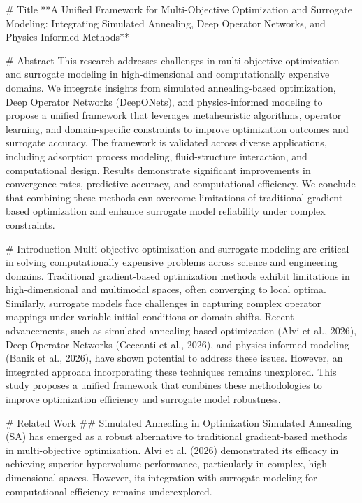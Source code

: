 # Title  
**A Unified Framework for Multi-Objective Optimization and Surrogate Modeling: Integrating Simulated Annealing, Deep Operator Networks, and Physics-Informed Methods**

# Abstract  
This research addresses challenges in multi-objective optimization and surrogate modeling in high-dimensional and computationally expensive domains. We integrate insights from simulated annealing-based optimization, Deep Operator Networks (DeepONets), and physics-informed modeling to propose a unified framework that leverages metaheuristic algorithms, operator learning, and domain-specific constraints to improve optimization outcomes and surrogate accuracy. The framework is validated across diverse applications, including adsorption process modeling, fluid-structure interaction, and computational design. Results demonstrate significant improvements in convergence rates, predictive accuracy, and computational efficiency. We conclude that combining these methods can overcome limitations of traditional gradient-based optimization and enhance surrogate model reliability under complex constraints.

# Introduction  
Multi-objective optimization and surrogate modeling are critical in solving computationally expensive problems across science and engineering domains. Traditional gradient-based optimization methods exhibit limitations in high-dimensional and multimodal spaces, often converging to local optima. Similarly, surrogate models face challenges in capturing complex operator mappings under variable initial conditions or domain shifts. Recent advancements, such as simulated annealing-based optimization (Alvi et al., 2026), Deep Operator Networks (Ceccanti et al., 2026), and physics-informed modeling (Banik et al., 2026), have shown potential to address these issues. However, an integrated approach incorporating these techniques remains unexplored. This study proposes a unified framework that combines these methodologies to improve optimization efficiency and surrogate model robustness.

# Related Work  
## Simulated Annealing in Optimization  
Simulated Annealing (SA) has emerged as a robust alternative to traditional gradient-based methods in multi-objective optimization. Alvi et al. (2026) demonstrated its efficacy in achieving superior hypervolume performance, particularly in complex, high-dimensional spaces. However, its integration with surrogate modeling for computational efficiency remains underexplored.

